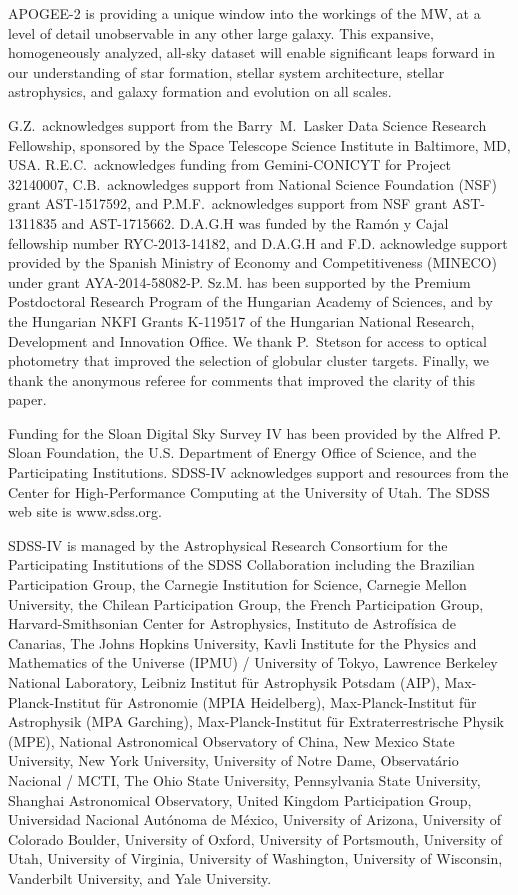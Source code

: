 \documentclass[12pt,twocolumn]{emulateapj}
\begin{document}
APOGEE-2 is providing a unique window into the workings of the MW, at a level of detail unobservable in any other large galaxy.  This expansive, homogeneously analyzed, all-sky dataset will enable significant leaps forward in our understanding of star formation, stellar system architecture, stellar astrophysics, and galaxy formation and evolution on all scales.

\begin{acknowledgments}


G.Z.~acknowledges support from the Barry~M.~Lasker Data Science Research Fellowship, sponsored by the Space Telescope Science Institute in Baltimore, MD, USA.
R.E.C.~acknowledges funding from Gemini-CONICYT for Project 32140007, 
C.B.~acknowledges support from National Science Foundation (NSF) grant AST-1517592, and
P.M.F.~acknowledges support from NSF grant AST-1311835 and AST-1715662.
D.A.G.H was funded by the Ram\'{o}n y Cajal fellowship number RYC-2013-14182, and D.A.G.H and
F.D. acknowledge support provided by the Spanish Ministry of Economy and
Competitiveness (MINECO) under grant AYA-2014-58082-P.
Sz.M. has been supported by the Premium Postdoctoral Research Program of the Hungarian Academy of Sciences, and by the Hungarian
NKFI Grants K-119517 of the Hungarian National Research, Development and Innovation Office.
We thank P.~Stetson for access to optical photometry that improved the selection of globular cluster targets.
Finally, we thank the anonymous referee for comments that improved the clarity of this paper.

Funding for the Sloan Digital Sky Survey IV has been provided by the Alfred P. Sloan Foundation, the U.S. Department of Energy Office of Science, and the Participating Institutions. SDSS-IV acknowledges support and resources from the Center for High-Performance Computing at the University of Utah. The SDSS web site is www.sdss.org.

SDSS-IV is managed by the Astrophysical Research Consortium for the Participating Institutions of the SDSS Collaboration including the Brazilian Participation Group, the Carnegie Institution for Science, Carnegie Mellon University, the Chilean Participation Group, the French Participation Group, Harvard-Smithsonian Center for Astrophysics, Instituto de Astrof\'isica de Canarias, The Johns Hopkins University, Kavli Institute for the Physics and Mathematics of the Universe (IPMU) / University of Tokyo, Lawrence Berkeley National Laboratory, Leibniz Institut f\"ur Astrophysik Potsdam (AIP),  Max-Planck-Institut f\"ur Astronomie (MPIA Heidelberg), Max-Planck-Institut f\"ur Astrophysik (MPA Garching), Max-Planck-Institut f\"ur Extraterrestrische Physik (MPE), National Astronomical Observatory of China, New Mexico State University, New York University, University of Notre Dame, Observat\'ario Nacional / MCTI, The Ohio State University, Pennsylvania State University, Shanghai Astronomical Observatory, United Kingdom Participation Group, Universidad Nacional Aut\'onoma de M\'exico, University of Arizona, University of Colorado Boulder, University of Oxford, University of Portsmouth, University of Utah, University of Virginia, University of Washington, University of Wisconsin, Vanderbilt University, and Yale University.


\end{acknowledgments}
\end{document}
